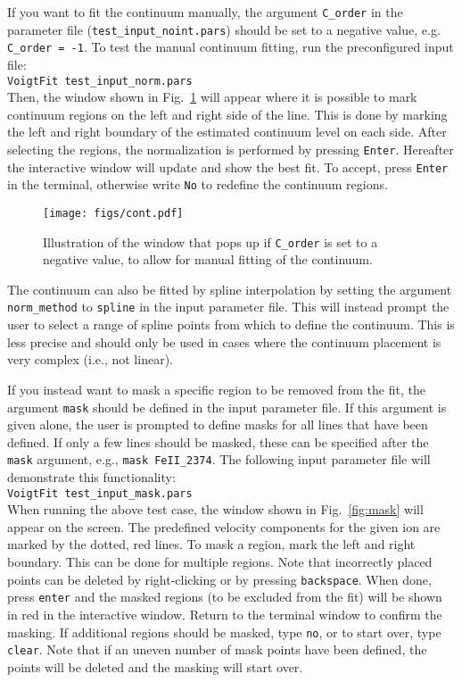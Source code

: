 \documentclass[a4paper]{article}
\begin{document}
If you want to fit the continuum manually, the argument \texttt{C\_order} in the parameter file (\texttt{test\_input\_noint.pars}) should be set to a negative value, e.g. \texttt{C\_order = -1}. To test the manual continuum fitting, run the preconfigured input file:\\

\texttt{VoigtFit test\_input\_norm.pars} \\

\noindent
Then, the window shown in Fig.~\ref{fig:cont} will appear where it is possible to mark continuum regions on the left and right side of the line. This is done by marking the left and right boundary of the estimated continuum level on each side. After selecting the regions, the normalization is performed by pressing \texttt{Enter}. Hereafter the interactive window will update and show the best fit. To accept, press \texttt{Enter} in the terminal, otherwise write \texttt{No} to redefine the continuum regions.

\begin{figure} [!h]
\centering
\texttt{[image: figs/cont.pdf]}
\caption{Illustration of the window that pops up if \texttt{C\_order} is set to a negative value, to allow for manual fitting of the continuum. \label{fig:cont}}
\end{figure}

The continuum can also be fitted by spline interpolation by setting the argument \texttt{norm\_method} to \texttt{spline} in the input parameter file. This will instead prompt the user to select a range of spline points from which to define the continuum. This is less precise and should only be used in cases where the continuum placement is very complex (i.e., not linear).


If you instead want to mask a specific region to be removed from the fit, the argument \texttt{mask} should be defined in the input parameter file. If this argument is given alone, the user is prompted to define masks for all lines that have been defined. If only a few lines should be masked, these can be specified after the \texttt{mask} argument, e.g., \texttt{mask FeII\_2374}.
The following input parameter file will demonstrate this functionality:\\

\texttt{VoigtFit test\_input\_mask.pars} \\

\noindent
When running the above test case, the window shown in Fig.~\ref{fig:mask} will appear on the screen. The predefined velocity components for the given ion are marked by the dotted, red lines. To mask a region, mark the left and right boundary. This can be done for multiple regions. Note that incorrectly placed points can be deleted by right-clicking or by pressing \texttt{backspace}. When done, press \texttt{enter} and the masked regions (to be excluded from the fit) will be shown in red in the interactive window. Return to the terminal window to confirm the masking. If additional regions should be masked, type \texttt{no}, or to start over, type \texttt{clear}. Note that if an uneven number of mask points have been defined, the points will be deleted and the masking will start over.
\end{document}
